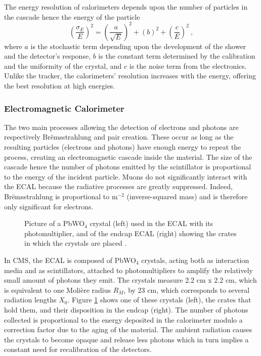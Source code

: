 			The energy resolution of calorimeters depends upon the number of particles in the cascade hence the energy of the particle
			\begin{equation}
				\left( \frac{\sigma_E}{E} \right)^2 = \left( \frac{a}{\sqrt{E}} \right)^2 + \left( b \right)^2 + \left( \frac{c}{E} \right)^2 \ ,
			\end{equation}
			where $ a $ is the stochastic term depending upon the development of the shower and the detector's response, $ b $ is the constant term determined by the calibration and the uniformity of the crystal, and $ c $ is the noise term from the electronics. Unlike the tracker, the calorimeters' resolution increases with the energy, offering the best resolution at high energies.

			\subsubsection{Electromagnetic Calorimeter}
			\label{sec:lhc_and_cms__electromagnetic_calorimeter}

				The two main processes allowing the detection of electrons and photons are respectively Brëmsstrahlung and pair creation. These occur as long as the resulting particles (electrons and photons) have enough energy to repeat the process, creating an electromagnetic cascade inside the material. The size of the cascade hence the number of photons emitted by the scintillator is proportional to the energy of the incident particle. Muons do not significantly interact with the ECAL because the radiative processes are greatly suppressed. Indeed, Brëmsstrahlung is proportional to m$ ^{-2} $ (inverse-squared mass) and is therefore only significant for electrons. \\

				\begin{figure}[h!]
					\centering
					\caption{Picture of a PbWO$ _4 $ crystal (left) used in the ECAL with its photomultiplier, and of the endcap ECAL (right) showing the crates in which the crystals are placed \Cite{CMS_at_LHC}.}
					\label{fig:lhc_and_cms__cms_ecal_view}
				\end{figure}

				In CMS, the ECAL is composed of PbWO$ _4 $ crystals, acting both as interaction media and as scintillators, attached to photomultipliers to amplify the relatively small amount of photons they emit. The crystals measure 2.2 cm x 2.2 cm, which is equivalent to one Molière radius $ R_M $, by 23 cm, which corresponds to several radiation lengths $ X_0 $. Figure \ref{fig:lhc_and_cms__cms_ecal_view} shows one of these crystals (left), the crates that hold them, and their disposition in the endcap (right). The number of photons collected is proportional to the energy deposited in the calorimeter modulo a correction factor due to the aging of the material. The ambient radiation causes the crystals to become opaque and release less photons which in turn implies a constant need for recalibration of the detectors.

